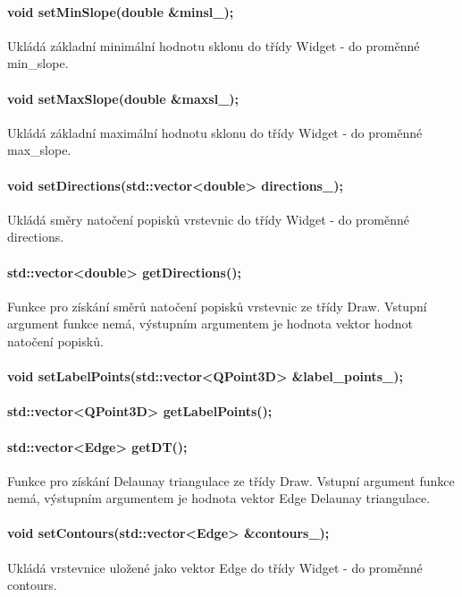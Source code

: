 \documentclass[11pt]{article}
\begin{document}
\paragraph {void setMinSlope(double \&minsl\_);}
Ukládá základní minimální hodnotu sklonu do třídy Widget - do proměnné min\_slope.

\paragraph {void setMaxSlope(double \&maxsl\_);}
Ukládá základní maximální hodnotu sklonu do třídy Widget - do proměnné max\_slope.

\paragraph {void setDirections(std::vector<double> directions\_);}
Ukládá směry natočení popisků vrstevnic do třídy Widget - do proměnné directions.

\paragraph {std::vector<double> getDirections();}
Funkce pro získání směrů natočení popisků vrstevnic ze třídy Draw. Vstupní argument funkce nemá, výstupním argumentem je hodnota vektor hodnot natočení popisků.
                           
\paragraph {void setLabelPoints(std::vector<QPoint3D> \&label\_points\_);}

\paragraph {std::vector<QPoint3D> getLabelPoints();}

\paragraph {std::vector<Edge> getDT();}
Funkce pro získání Delaunay triangulace ze třídy Draw. Vstupní argument funkce nemá, výstupním argumentem je hodnota vektor Edge Delaunay triangulace.

\paragraph {void setContours(std::vector<Edge> \&contours\_);}
Ukládá vrstevnice uložené jako vektor Edge do třídy Widget - do proměnné contours.
\end{document}
